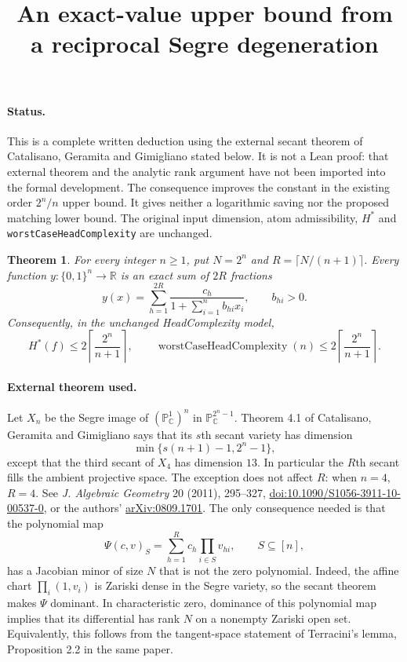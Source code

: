 \documentclass[11pt]{article}
\newtheorem{theorem}{Theorem}
\begin{document}
\title{An exact-value upper bound from a reciprocal Segre degeneration}
\author{}
\date{}
\maketitle

\paragraph{Status.}
This is a complete written deduction using the external secant theorem
of Catalisano, Geramita and Gimigliano stated below. It is not a Lean
proof: that external theorem and the analytic rank argument have not
been imported into the formal development. The consequence improves
the constant in the existing order $2^n/n$ upper bound. It gives
neither a logarithmic saving nor the proposed matching lower bound.
The original input dimension, atom admissibility, $H^*$ and
\texttt{worstCaseHeadComplexity} are unchanged.

\begin{theorem}\label{thm:exact}
For every integer $n\geq1$, put $N=2^n$ and
$R=\lceil N/(n+1)\rceil$. Every function
$y:\{0,1\}^n\to\mathbb R$ is an exact sum of $2R$ fractions
\[
 y(x)=\sum_{h=1}^{2R}\frac{c_h}{1+\sum_{i=1}^n b_{hi}x_i},
 \qquad b_{hi}>0.
\]
Consequently, in the unchanged HeadComplexity model,
\[
 H^*(f)\leq2\left\lceil\frac{2^n}{n+1}\right\rceil,
 \qquad
 \operatorname{worstCaseHeadComplexity}(n)
 \leq2\left\lceil\frac{2^n}{n+1}\right\rceil.
\]
\end{theorem}

\paragraph{External theorem used.}
Let $X_n$ be the Segre image of $(\mathbb P^1_{\mathbb C})^n$ in
$\mathbb P^{2^n-1}_{\mathbb C}$. Theorem 4.1 of Catalisano, Geramita
and Gimigliano says that its $s$th secant variety has dimension
\[
 \min\{s(n+1)-1,2^n-1\},
\]
except that the third secant of $X_4$ has dimension $13$.
In particular the $R$th secant fills the ambient projective space.
The exception does not affect $R$: when $n=4$, $R=4$.
See \emph{J. Algebraic Geometry} 20 (2011), 295--327,
\href{https://doi.org/10.1090/S1056-3911-10-00537-0}{doi:10.1090/S1056-3911-10-00537-0},
or the authors' \href{https://arxiv.org/abs/0809.1701}{arXiv:0809.1701}.
The only consequence needed is that the polynomial map
\[
 \Psi(c,v)_S=\sum_{h=1}^R c_h\prod_{i\in S}v_{hi},
 \qquad S\subseteq[n],
\]
has a Jacobian minor of size $N$ that is not the zero polynomial.
Indeed, the affine chart $\prod_i(1,v_i)$ is Zariski dense in the
Segre variety, so the secant theorem makes $\Psi$ dominant.
In characteristic zero, dominance of this polynomial map implies
that its differential has rank $N$ on a nonempty Zariski open set.
Equivalently, this follows from the tangent-space statement of
Terracini's lemma, Proposition 2.2 in the same paper.
\end{document}
